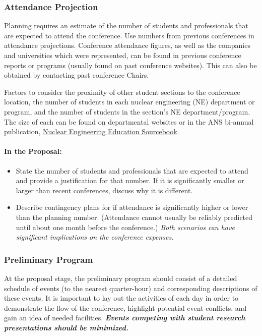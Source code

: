 \documentclass[12pt]{article}
\begin{document}
\subsubsection{Attendance Projection}
Planning requires an estimate of the number of students and professionals that are expected to attend the conference. Use numbers from previous conferences in attendance projections.
Conference attendance figures, as well as the companies and universities which were
represented, can be found in previous conference reports or programs (usually found on
past conference websites). This can also be obtained by contacting past conference Chairs.

Factors to consider the proximity of other student sections to the conference
location, the number of students in each nuclear engineering (NE) department or program, and the number of students in the section's NE department/program. The size of each can be found on departmental websites or in the ANS bi-annual publication, \href{https://www.energy.gov/ne/downloads/nuclear-science-and-engineering-education-sourcebook}{Nuclear Engineering Education Sourcebook}.

\paragraph{In the Proposal:}
\begin{itemize}
\item{State the number of students and professionals that are expected to attend and provide a
justification for that number. If it is significantly smaller or larger than recent
conferences, discuss why it is different.}
\item{Describe contingency plans for if attendance is significantly higher or lower
than the planning number. (Attendance cannot usually be reliably predicted until about one month before the conference.) 
\emph{Both scenarios can have significant implications on the conference expenses.}}
\end{itemize}

\subsubsection{Preliminary Program}
At the proposal stage, the preliminary program should consist of a detailed schedule of
events (to the nearest quarter-hour) and corresponding descriptions of these
events. It is important to lay out the activities of each day in order to demonstrate the
flow of the conference, highlight potential event conflicts, and gain an idea of needed
facilities. \textit{\textbf{Events competing with student research presentations should be minimized.}}
\end{document}
